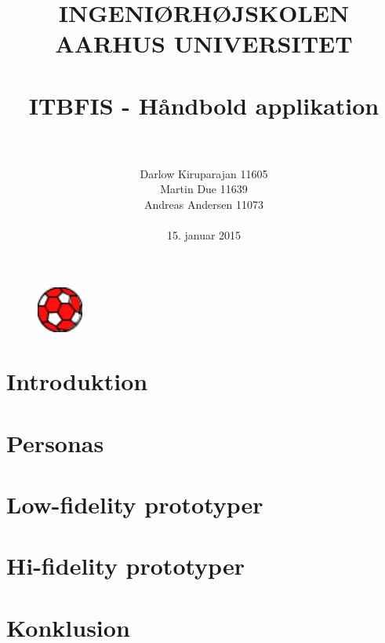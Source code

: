 \documentclass[paper=a4, fontsize=11pt]{scrartcl}	%
\title{
		\usefont{OT1}{bch}{b}{n}
		\normalfont \normalsize \textsc{INGENIØRHØJSKOLEN AARHUS UNIVERSITET} \\ [25pt]
		\horrule{0.5pt} \\[0.4cm]
		\huge ITBFIS - Håndbold applikation \\
		\horrule{2pt} \\[0.5cm]
}
\author{
		\normalfont 								\normalsize
        Darlow Kiruparajan 11605\\\normalsize Martin Due 11639\\\normalsize Andreas Andersen 11073\\\\[-3pt]		\normalsize
        15. januar 2015
}
\date{}
\numberwithin{equation}{section}		%
\numberwithin{figure}{section}			%
\numberwithin{table}{section}				%
\begin{document}
\maketitle
\begin{figure}[ht!]
		\centering
		\includegraphics[width=15mm]{images/handballl}
		\end{figure}


\newpage
\renewcommand{\figurename}{Figur}
\renewcommand\contentsname{Indholdsfortegnelse}
\tableofcontents

\newpage
\section*{Introduktion}


\newpage
\section*{Personas}


\newpage
\section*{Low-fidelity prototyper}


\section*{Hi-fidelity prototyper}


\newpage
\section*{Konklusion}


\end{document}
